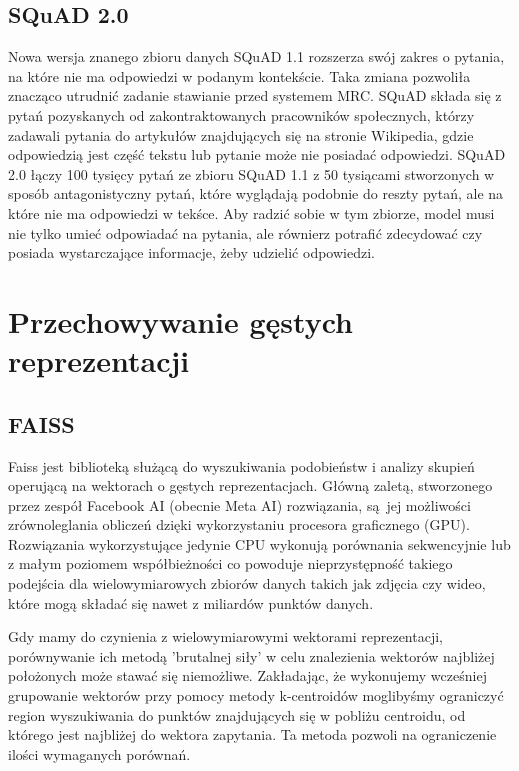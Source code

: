 \subsection{SQuAD 2.0}

Nowa wersja znanego zbioru danych SQuAD 1.1 rozszerza swój zakres o pytania, na które nie ma odpowiedzi w podanym kontekście. Taka zmiana pozwoliła znacząco utrudnić zadanie stawianie przed systemem MRC. SQuAD składa się z pytań pozyskanych od zakontraktowanych pracowników społecznych, którzy zadawali pytania do artykułów znajdujących się na stronie Wikipedia, gdzie odpowiedzią jest część tekstu lub pytanie może nie posiadać odpowiedzi. SQuAD 2.0 łączy 100 tysięcy pytań ze zbioru SQuAD 1.1 z 50 tysiącami stworzonych w sposób antagonistyczny pytań, które wyglądają podobnie do reszty pytań, ale na które nie ma odpowiedzi w tekśce. Aby radzić sobie w tym zbiorze, model musi nie tylko umieć odpowiadać na pytania, ale równierz potrafić zdecydować czy posiada wystarczające informacje, żeby udzielić odpowiedzi.

\section{Przechowywanie gęstych reprezentacji}

\subsection{FAISS}

Faiss jest biblioteką służącą do wyszukiwania podobieństw i analizy skupień operującą na wektorach o gęstych reprezentacjach. \autocite{faiss} Główną zaletą, stworzonego przez zespół Facebook AI (obecnie Meta AI) rozwiązania, są jej możliwości zrównoleglania obliczeń dzięki wykorzystaniu procesora graficznego (GPU). Rozwiązania wykorzystujące jedynie CPU wykonują porównania sekwencyjnie lub z małym poziomem współbieżności co powoduje nieprzystępność takiego podejścia dla wielowymiarowych zbiorów danych takich jak zdjęcia czy wideo, które mogą składać się nawet z miliardów punktów danych. \autocite{johnson2019billion} \newline

Gdy mamy do czynienia z wielowymiarowymi wektorami reprezentacji, porównywanie ich metodą 'brutalnej siły' w celu znalezienia wektorów najbliżej położonych może stawać się niemożliwe. Zakładając, że wykonujemy wcześniej grupowanie wektorów przy pomocy metody k-centroidów moglibyśmy ograniczyć region wyszukiwania do punktów znajdujących się w pobliżu centroidu, od którego jest najbliżej do wektora zapytania. Ta metoda pozwoli na ograniczenie ilości wymaganych porównań. \newline

